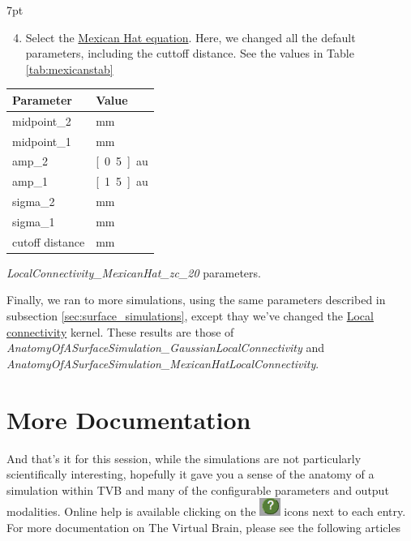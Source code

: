 \documentclass{tufte-handout}
\newenvironment{formal}{%
  \def\FrameCommand{%
    \hspace{1pt}%
    {\color{DarkBlue}\vrule width 2pt}%
    {\color{formalshade}\vrule width 4pt}%
    \colorbox{formalshade}%
  }%
  \MakeFramed{\advance\hsize-\width\FrameRestore}%
  \noindent\hspace{-4.55pt}%
  \begin{adjustwidth}{}{7pt}%
  \vspace{2pt}\vspace{2pt}%
}
{%
  \vspace{2pt}\end{adjustwidth}\endMakeFramed%
}
\begin{document}
\begin{formal}
\begin{enumerate}[resume]
\setcounter{enumi}{3}
\item Select the \underline{Mexican Hat equation}. Here, we changed all the default parameters, including the cuttoff distance. See the values in Table \ref{tab:mexicanstab}
\end{enumerate}
\end{formal}

\begin{margintable}
  \centering
  \selectfont
  \begin{tabular}{ll}
    \toprule
    Parameter & Value \\
    \midrule
             midpoint\_2          &   \unit[5]{mm}   \\
             midpoint\_1          &   \unit[0]{mm}\\
             amp\_2                 &   \unit[0.5]{au}        \\
             amp\_1                 &   \unit[1.5]{au}        \\
             sigma\_2          &   \unit[5]{mm}   \\
             sigma\_1          &   \unit[2]{mm}   \\
             cutoff distance & \unit[20]{mm}\\
    \bottomrule
  \end{tabular}
  \caption{\textit{LocalConnectivity\_MexicanHat\_zc\_20} parameters. }
  \label{tab:mexicanstab}
\end{margintable}

Finally, we ran to more simulations, using the same parameters described in subsection \ref{sec:surface_simulations}, except thay we've changed the \underline{Local connectivity} kernel. These results are those of \textit{AnatomyOfASurfaceSimulation\_GaussianLocalConnectivity} and \textit{AnatomyOfASurfaceSimulation\_MexicanHatLocalConnectivity}.
 

\section{More Documentation}\label{sec:more-doc}
And that's it for this session, while the simulations are not particularly scientifically
interesting, hopefully it gave you a sense of the anatomy of a
simulation within TVB and many of the configurable parameters and output
modalities. Online help is available clicking on the \includegraphics[width=0.05\textwidth]{butt_green_help} icons next to each entry.
For more documentation on The Virtual Brain, please see the following articles \citep{Ghosh_2008, Sanz-Leon_2013, Spiegler_2013, Woodman_2014, Jirsa_2010b}
\end{document}
